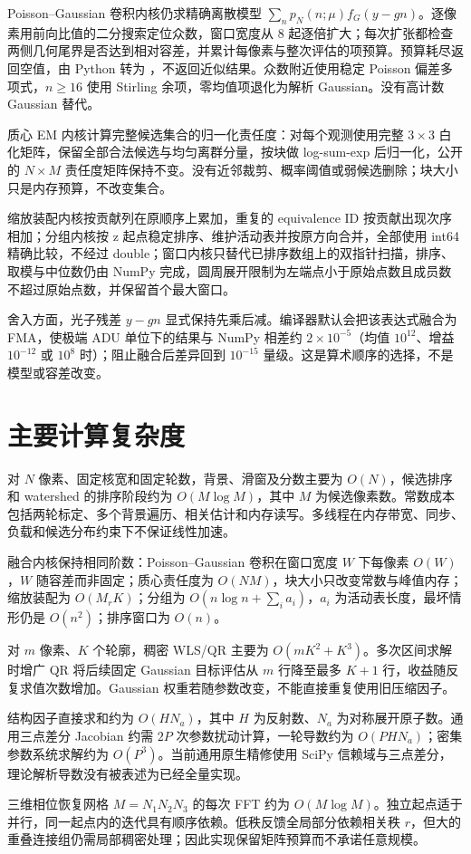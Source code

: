 Poisson--Gaussian 卷积内核仍求精确离散模型 $\sum_n p_N(n;\mu)f_G(y-gn)$。逐像素用前向比值的二分搜索定位众数，窗口宽度从 8 起逐倍扩大；每次扩张都检查两侧几何尾界是否达到相对容差，并累计每像素与整次评估的项预算。预算耗尽返回空值，由 Python 转为 ，不返回近似结果。众数附近使用稳定 Poisson 偏差多项式，$n\ge16$ 使用 Stirling 余项，零均值项退化为解析 Gaussian。没有高计数 Gaussian 替代。

质心 EM 内核计算完整候选集合的归一化责任度：对每个观测使用完整 $3\times3$ 白化矩阵，保留全部合法候选与均匀离群分量，按块做 log-sum-exp 后归一化，公开的 $N\times M$ 责任度矩阵保持不变。没有近邻裁剪、概率阈值或弱候选删除；块大小只是内存预算，不改变集合。

缩放装配内核按贡献列在原顺序上累加，重复的 equivalence ID 按贡献出现次序相加；分组内核按 z 起点稳定排序、维护活动表并按原方向合并，全部使用 int64 精确比较，不经过 double；窗口内核只替代已排序数组上的双指针扫描，排序、取模与中位数仍由 NumPy 完成，圆周展开限制为左端点小于原始点数且成员数不超过原始点数，并保留首个最大窗口。

舍入方面，光子残差 $y-gn$ 显式保持先乘后减。编译器默认会把该表达式融合为 FMA，使极端 ADU 单位下的结果与 NumPy 相差约 $2\times10^{-5}$（均值 $10^{12}$、增益 $10^{-12}$ 或 $10^{8}$ 时）；阻止融合后差异回到 $10^{-15}$ 量级。这是算术顺序的选择，不是模型或容差改变。

\section{主要计算复杂度}
对 $N$ 像素、固定核宽和固定轮数，背景、滑窗及分数主要为 $O(N)$，候选排序和 watershed 的排序阶段约为 $O(M\log M)$，其中 $M$ 为候选像素数。常数成本包括两轮标定、多个背景遍历、相关估计和内存读写。多线程在内存带宽、同步、负载和候选分布约束下不保证线性加速。

融合内核保持相同阶数：Poisson--Gaussian 卷积在窗口宽度 $W$ 下每像素 $O(W)$，$W$ 随容差而非固定；质心责任度为 $O(NM)$，块大小只改变常数与峰值内存；缩放装配为 $O(M_rK)$；分组为 $O(n\log n+\sum_i a_i)$，$a_i$ 为活动表长度，最坏情形仍是 $O(n^2)$；排序窗口为 $O(n)$。

对 $m$ 像素、$K$ 个轮廓，稠密 WLS/QR 主要为 $O(mK^2+K^3)$。多次区间求解时增广 QR 将后续固定 Gaussian 目标评估从 $m$ 行降至最多 $K+1$ 行，收益随反复求值次数增加。Gaussian 权重若随参数改变，不能直接重复使用旧压缩因子。

结构因子直接求和约为 $O(HN_a)$，其中 $H$ 为反射数、$N_a$ 为对称展开原子数。通用三点差分 Jacobian 约需 $2P$ 次参数扰动计算，一轮导数约为 $O(PHN_a)$；密集参数系统求解约为 $O(P^3)$。当前通用原生精修使用 SciPy 信赖域与三点差分，理论解析导数没有被表述为已经全量实现。

三维相位恢复网格 $M=N_1N_2N_3$ 的每次 FFT 约为 $O(M\log M)$。独立起点适于并行，同一起点内的迭代具有顺序依赖。低秩反馈全局部分依赖相关秩 $r$，但大的重叠连接组仍需局部稠密处理；因此实现保留矩阵预算而不承诺任意规模。
